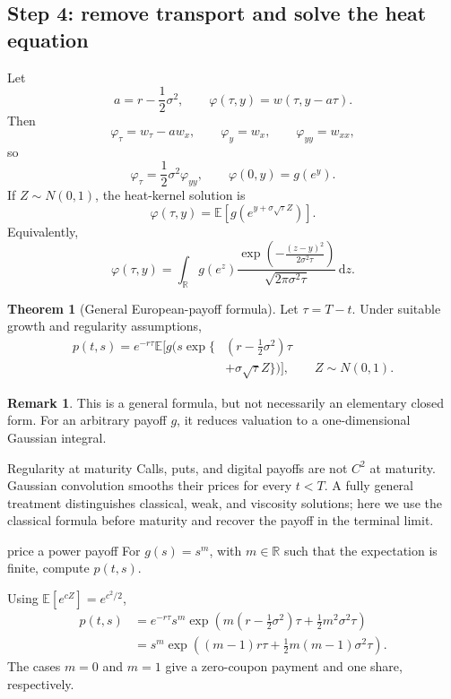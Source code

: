 \documentclass[10pt]{article}
\newcommand{\E}{\mathbb E}
\newcommand{\R}{\mathbb R}
\newcommand{\1}{\mathbf 1}
\newcommand{\dd}{\,\mathrm d}
\theoremstyle{definition}
\newtheorem{theorem}[definition]{Theorem}
\newtheorem{remark}[definition]{Remark}
\begin{document}
\subsection{Step 4: remove transport and solve the heat equation}

Let
\[
a=r-\frac12\sigma^2,
\qquad
\varphi(\tau,y)=w(\tau,y-a\tau).
\]
Then
\[
\varphi_\tau=w_\tau-aw_x,\qquad
\varphi_y=w_x,\qquad
\varphi_{yy}=w_{xx},
\]
so
\[
\boxed{
\varphi_\tau=\frac12\sigma^2\varphi_{yy},
\qquad
\varphi(0,y)=g(e^y).}
\]
If \(Z\sim N(0,1)\), the heat-kernel solution is
\[
\varphi(\tau,y)
=\E\left[g\left(e^{y+\sigma\sqrt{\tau}Z}\right)\right].
\]
Equivalently,
\[
\varphi(\tau,y)
=\int_{\R}g(e^z)
\frac{\exp\left(-\frac{(z-y)^2}{2\sigma^2\tau}\right)}
{\sqrt{2\pi\sigma^2\tau}}\dd z.
\]

\begin{theorem}[General European-payoff formula]
Let \(\tau=T-t\). Under suitable growth and regularity assumptions,
\[
\boxed{
\begin{aligned}
p(t,s)
=e^{-r\tau}\E\Bigg[
g\Bigg(
s\exp\Big\{&
\left(r-\frac12\sigma^2\right)\tau\\
&+\sigma\sqrt{\tau}Z
\Big\}
\Bigg)
\Bigg],
\qquad Z\sim N(0,1).
\end{aligned}}
\]
\end{theorem}

\begin{remark}
This is a general formula, but not necessarily an elementary closed form.
For an arbitrary payoff \(g\), it reduces valuation to a one-dimensional
Gaussian integral.
\end{remark}

\begin{warningbox}{Regularity at maturity}
Calls, puts, and digital payoffs are not \(C^2\) at maturity. Gaussian
convolution smooths their prices for every \(t<T\). A fully general treatment
distinguishes classical, weak, and viscosity solutions; here we use the
classical formula before maturity and recover the payoff in the terminal
limit.
\end{warningbox}

\begin{studentexercise}{price a power payoff}
For \(g(s)=s^m\), with \(m\in\R\) such that the expectation is finite,
compute \(p(t,s)\).
\end{studentexercise}
\begin{shortsolution}
Using \(\E[e^{cZ}]=e^{c^2/2}\),
\[
\begin{aligned}
p(t,s)
&=e^{-r\tau}s^m
\exp\left(
m(r-\tfrac12\sigma^2)\tau
+\tfrac12m^2\sigma^2\tau
\right)\\
&=\boxed{
s^m\exp\left(
(m-1)r\tau+\frac12m(m-1)\sigma^2\tau
\right).}
\end{aligned}
\]
The cases \(m=0\) and \(m=1\) give a zero-coupon payment and one share,
respectively.
\end{shortsolution}
\end{document}
